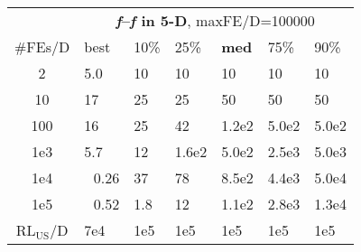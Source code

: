 \begin{tabular}{c|llllll}
 & \multicolumn{6}{|c}{\textbf{\textit{f}\raisebox{-0.35ex}{1}--\textit{f}\raisebox{-0.35ex}{55} in 5-D}, maxFE/D=100000}\\
\#FEs/D & best & 10\% & 25\% & \textbf{med} & 75\% & 90\%\\
2 & \hspace*{1ex}5.0 & 10 & 10 & 10 & 10 & 10\\
10 & 17 & 25 & 25 & 50 & 50 & 50\\
100 & 16 & 25 & 42 & 1.2e2 & 5.0e2 & 5.0e2\\
1e3 & \hspace*{1ex}5.7 & 12 & 1.6e2 & 5.0e2 & 2.5e3 & 5.0e3\\
1e4 & ~\,0.26 & 37 & 78 & 8.5e2 & 4.4e3 & 5.0e4\\
1e5 & ~\,0.52 & \hspace*{1ex}1.8 & 12 & 1.1e2 & 2.8e3 & 1.3e4\\
$\text{RL}_{\text{US}}$/D & 7e4 & 1e5 & 1e5 & 1e5 & 1e5 & 1e5
\end{tabular}
